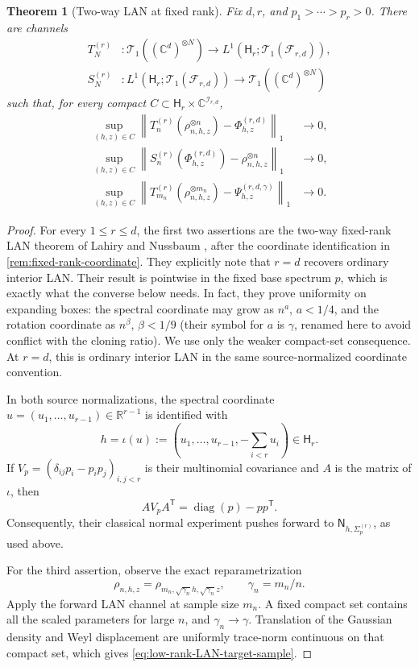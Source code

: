 \documentclass[11pt]{article}
\newtheorem{theorem}{Theorem}[section]
\theoremstyle{remark}
\theoremstyle{plain}
\newcommand{\C}{\mathbb C}
\newcommand{\R}{\mathbb R}
\newcommand{\cF}{\mathcal F}
\newcommand{\cT}{\mathcal T}
\newcommand{\diag}{\operatorname{diag}}
\newcommand{\ot}{\otimes}
\begin{document}
\begin{theorem}[Two-way LAN at fixed rank]
\label{thm:fixed-rank-LAN}
Fix \(d,r\), and \(p_1>\cdots>p_r>0\).  There are channels
\begin{align*}
  T_N^{(r)} &: \cT_1((\C^d)^{\ot N})
    \longrightarrow L^1(\mathsf H_r;\cT_1(\cF_{r,d})),\\
  S_N^{(r)} &: L^1(\mathsf H_r;\cT_1(\cF_{r,d}))
    \longrightarrow \cT_1((\C^d)^{\ot N})
\end{align*}
such that, for every compact
\(C\subset\mathsf H_r\times\C^{\mathcal I_{r,d}}\),
\begin{align}
  \sup_{(h,z)\in C}
  \left\|T_n^{(r)}(\rho_{n,h,z}^{\ot n})
             -\Phi_{h,z}^{(r,d)}\right\|_1&\longrightarrow0,
  \label{eq:low-rank-LAN-forward}\\
  \sup_{(h,z)\in C}
  \left\|S_n^{(r)}(\Phi_{h,z}^{(r,d)})
             -\rho_{n,h,z}^{\ot n}\right\|_1&\longrightarrow0,
  \label{eq:low-rank-LAN-reverse}\\
  \sup_{(h,z)\in C}
  \left\|T_{m_n}^{(r)}(\rho_{n,h,z}^{\ot m_n})
             -\Psi_{h,z}^{(r,d,\gamma)}\right\|_1&\longrightarrow0.
  \label{eq:low-rank-LAN-target-sample}
\end{align}
\end{theorem}

\begin{proof}
For every \(1\le r\le d\), the first two assertions are the two-way
fixed-rank LAN theorem of Lahiry and Nussbaum
\cite[Theorem~3.3]{LahiryNussbaum2024}, after the coordinate identification
in \cref{rem:fixed-rank-coordinate}.  They explicitly note that \(r=d\)
recovers ordinary interior LAN.  Their result is pointwise in the fixed base
spectrum \(p\), which is exactly what the converse below needs.  In fact,
they prove uniformity on expanding boxes: the spectral coordinate may grow
as \(n^a\), \(a<1/4\), and the rotation coordinate as \(n^\beta\),
\(\beta<1/9\) (their symbol for \(a\) is \(\gamma\), renamed here to avoid
conflict with the cloning ratio).  We use only the weaker compact-set
consequence.  At \(r=d\), this is ordinary interior LAN in the same
source-normalized coordinate convention.

In both source normalizations, the spectral coordinate
\(u=(u_1,\ldots,u_{r-1})\in\R^{r-1}\) is identified with
\[
  h=\iota(u)
  :=\left(u_1,\ldots,u_{r-1},-\sum_{i<r}u_i\right)\in\mathsf H_r.
\]
If \(V_p=(\delta_{ij}p_i-p_ip_j)_{i,j<r}\) is their multinomial
covariance and \(A\) is the matrix of \(\iota\), then
\[
  AV_pA^{\mathsf T}=\diag(p)-pp^{\mathsf T}.
\]
Consequently, their classical normal experiment pushes forward to
\(\mathsf N_{h,\Sigma_p^{(r)}}\), as used above.

For the third assertion, observe the exact reparametrization
\[
  \rho_{n,h,z}
  =\rho_{m_n,\sqrt{\gamma_n}h,\sqrt{\gamma_n}z},
  \qquad \gamma_n=m_n/n.
\]
Apply the forward LAN channel at sample size \(m_n\).  A fixed compact set
contains all the scaled parameters for large \(n\), and
\(\gamma_n\to\gamma\).  Translation of the Gaussian density and Weyl
displacement are uniformly trace-norm continuous on that compact set, which
gives \eqref{eq:low-rank-LAN-target-sample}.
\end{proof}
\end{document}
